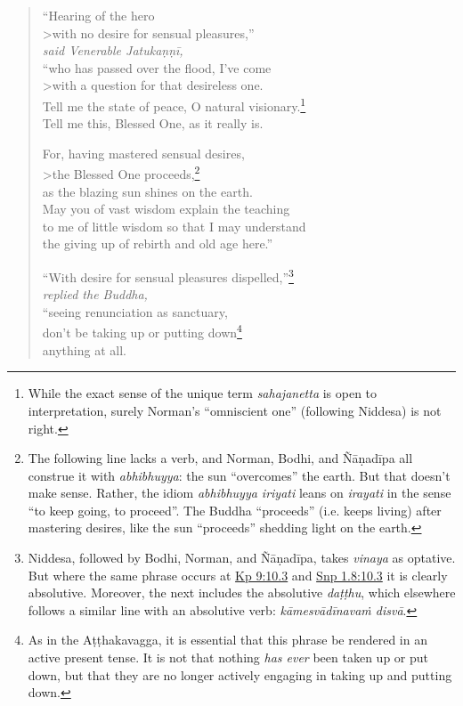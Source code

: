 \documentclass[12pt,openany]{book}%
\newcommand*{\scspeaker}[1]{\hspace{2em}\textit{#1}}
\begin{document}
\begin{verse}%
“Hearing of the hero \\>with no desire for sensual pleasures,” \\
\scspeaker{said Venerable \textsanskrit{Jatukaṇṇī}, }\\
“who has passed over the flood, I’ve come \\>with a question for that desireless one. \\
Tell me the state of peace, O natural visionary.\footnote{While the exact sense of the unique term \textit{sahajanetta} is open to interpretation, surely Norman’s “omniscient one” (following Niddesa) is not right. } \\
Tell me this, Blessed One, as it really is. 

For, having mastered sensual desires, \\>the Blessed One proceeds,\footnote{The following line lacks a verb, and Norman, Bodhi, and \textsanskrit{Ñāṇadīpa} all construe it with \textit{abhibhuyya}: the sun “overcomes” the earth. But that doesn’t make sense. Rather, the idiom \textit{abhibhuyya iriyati} leans on \textit{irayati} in the sense “to keep going, to proceed”. The Buddha “proceeds” (i.e. keeps living) after mastering desires, like the sun “proceeds” shedding light on the earth. } \\
as the blazing sun shines on the earth. \\
May you of vast wisdom explain the teaching \\
to me of little wisdom so that I may understand \\
the giving up of rebirth and old age here.” 

“With desire for sensual pleasures dispelled,”\footnote{Niddesa, followed by Bodhi, Norman, and \textsanskrit{Ñāṇadīpa}, takes \textit{vinaya} as optative. But where the same phrase occurs at \href{https://suttacentral.net/kp9/en/sujato\#10.3}{Kp 9:10.3} and \href{https://suttacentral.net/snp1.8/en/sujato\#10.3}{Snp 1.8:10.3} it is clearly absolutive. Moreover, the next includes the absolutive \textit{\textsanskrit{daṭṭhu}}, which elsewhere follows a similar line with an absolutive verb: \textit{\textsanskrit{kāmesvādīnavaṁ} \textsanskrit{disvā}}. } \\
\scspeaker{replied the Buddha, }\\
“seeing renunciation as sanctuary, \\
don’t be taking up or putting down\footnote{As in the \textsanskrit{Aṭṭhakavagga}, it is essential that this phrase be rendered in an active present tense. It is not that nothing \emph{has ever} been taken up or put down, but that they are no longer actively engaging in taking up and putting down. } \\
anything at all. 


\end{verse}
\end{document}
